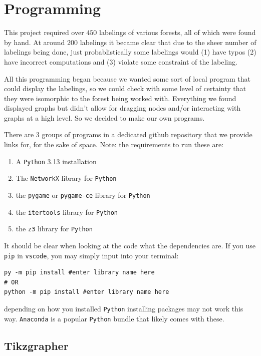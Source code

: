 \chapter{Programming}\label{chap:programming}
This project required over $450$ labelings of various forests, all of which were found by hand. At around $200$ labelings it became clear that due to the sheer number of labelings being done, just probablistically some labelings would (1) have typos (2) have incorrect computations and (3) violate some constraint of the labeling.

All this programming began because we wanted some sort of local program that could display the labelings, so we could check with some level of certainty that they were isomorphic to the forest being worked with. Everything we found displayed graphs but didn't allow for dragging nodes and/or interacting with graphs at a high level. So we decided to make our own programs.

There are $3$ groups of programs in a dedicated github repository that we provide links for, for the sake of space. Note: the requirements to run these are:

\begin{enumerate}
  \item A \verb|Python| 3.13 installation
  \item The \verb|NetworkX| library for \verb|Python|
  \item the \verb|pygame| or \verb|pygame-ce| library for \verb|Python|
  \item the \verb|itertools| library for \verb|Python|
  \item the \verb|z3| library for \verb|Python|
\end{enumerate}
It should be clear when looking at the code what the dependencies are. If you use \verb|pip| in \verb|vscode|, you may simply input into your terminal: 
\begin{verbatim}
py -m pip install #enter library name here
# OR
python -m pip install #enter library name here
\end{verbatim}
depending on how you installed \verb|Python| installing packages may not work this way. \verb|Anaconda| is a popular \verb|Python| bundle that likely comes with these.

\section{Tikzgrapher}

